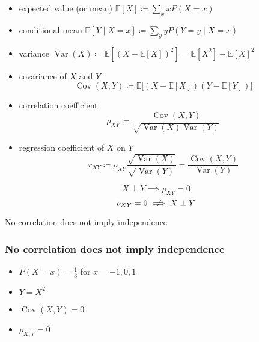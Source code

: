 \documentclass[UTF8,11pt,colorlinks,compress,openany]{beamer}%
\begin{document}
\begin{frame}\frametitle{}
\begin{itemize}
	\item expected value (or mean) $\mathbb{E}[X]\coloneqq\sum\limits_x xP(X=x)$
	\item conditional mean $\mathbb{E}[Y\mid X=x]\coloneqq\sum\limits_y yP(Y=y\mid X=x)$
	\item variance $\operatorname{Var}(X)\coloneqq \mathbb{E}\left[(X-\mathbb{E}[X])^2\right]=\mathbb{E}[X^2]-\mathbb{E}[X]^2$
	\item covariance of $X$ and $Y$
	\[\operatorname{Cov}(X,Y)\coloneqq\mathbb{E}\big[(X-\mathbb{E}[X])(Y-\mathbb{E}[Y])\big]\]
	\item correlation coefficient
	\[\rho_{XY}\coloneqq\frac{\operatorname{Cov}(X,Y)}{\sqrt{\operatorname{Var}(X)\operatorname{Var}(Y)}}\]
	\item regression coefficient of $X$ on $Y$
	\[r_{XY}\coloneqq\rho_{XY}\frac{\sqrt{\operatorname{Var}(X)}}{\sqrt{\operatorname{Var}(Y)}}=\frac{\operatorname{Cov}(X,Y)}{\operatorname{Var}(Y)}\]
\end{itemize}
\[X\perp Y\implies \rho_{XY}=0\]
\[\rho_{XY}=0\centernot\implies X\perp Y\]
\centerline{No correlation does not imply independence}
\end{frame}

\begin{frame}\frametitle{No correlation does not imply independence}
\begin{itemize}
	\item $P(X=x)=\frac{1}{3}$ for $x=-1,0,1$
	\item $Y=X^2$
	\item $\operatorname{Cov}(X,Y)=0$
	\item $\rho_{X,Y}=0$
\end{itemize}
\end{frame}
\end{document}
